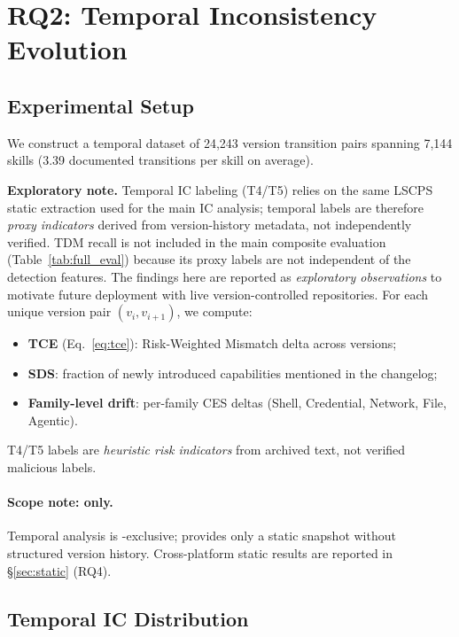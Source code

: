 
\section{RQ2: Temporal Inconsistency Evolution}
\label{sec:temporal}

\subsection{Experimental Setup}

We construct a temporal dataset of 24,243 version transition pairs spanning 7,144 \clawhub{} skills (3.39 documented transitions per skill on average).

\noindent\textbf{Exploratory note.} Temporal IC labeling (T4/T5) relies on the same
LSCPS static extraction used for the main IC analysis; temporal labels are therefore
\emph{proxy indicators} derived from version-history metadata, not independently verified.
TDM recall is not included in the main composite evaluation (Table~\ref{tab:full_eval})
because its proxy labels are not independent of the detection features.
The findings here are reported as \emph{exploratory observations} to motivate
future deployment with live version-controlled repositories.
For each unique version pair $(v_i, v_{i+1})$, we compute:
\begin{itemize}[topsep=2pt,itemsep=1pt]
    \item \textbf{TCE} (Eq.~\ref{eq:tce}): Risk-Weighted Mismatch delta across versions;
    \item \textbf{SDS}: fraction of newly introduced capabilities mentioned in the changelog;
    \item \textbf{Family-level drift}: per-family CES deltas (Shell, Credential, Network, File, Agentic).
\end{itemize}
T4/T5 labels are \emph{heuristic risk indicators} from archived text, not verified malicious labels.

\paragraph{Scope note: \clawhub{} only.}
Temporal analysis is \clawhub{}-exclusive; \skillssh{} provides only a static snapshot
without structured version history.
Cross-platform static results are reported in \S\ref{sec:static} (RQ4).

\subsection{Temporal IC Distribution}

